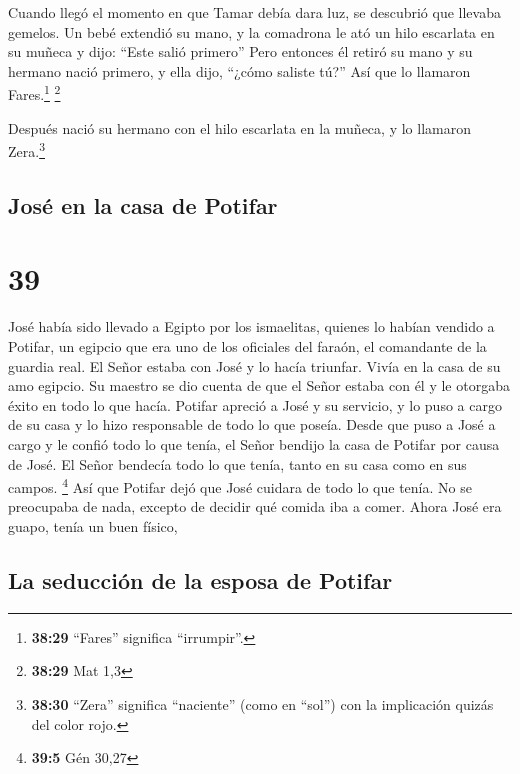  Cuando llegó el momento en que Tamar debía dara luz, se
descubrió que llevaba gemelos.  Un bebé extendió su mano,
y la comadrona le ató un hilo escarlata en su muñeca y dijo: ``Este
salió primero''  Pero entonces él retiró su mano y su
hermano nació primero, y ella dijo, ``¿cómo saliste tú?'' Así que lo
llamaron Fares.\footnote{\textbf{38:29} ``Fares'' significa
  ``irrumpir''.} \footnote{\textbf{38:29} Mat 1,3}

 Después nació su hermano con el hilo escarlata en la
muñeca, y lo llamaron Zera.\footnote{\textbf{38:30} ``Zera'' significa
  ``naciente'' (como en ``sol'') con la implicación quizás del color
  rojo.}

\hypertarget{josuxe9-en-la-casa-de-potifar}{%
\subsection{José en la casa de
Potifar}\label{josuxe9-en-la-casa-de-potifar}}

\hypertarget{section-38}{%
\section{39}\label{section-38}}

 José había sido llevado a Egipto por los ismaelitas,
quienes lo habían vendido a Potifar, un egipcio que era uno de los
oficiales del faraón, el comandante de la guardia real. 
El Señor estaba con José y lo hacía triunfar. Vivía en la casa de su amo
egipcio.  Su maestro se dio cuenta de que el Señor estaba
con él y le otorgaba éxito en todo lo que hacía.  Potifar
apreció a José y su servicio, y lo puso a cargo de su casa y lo hizo
responsable de todo lo que poseía.  Desde que puso a José
a cargo y le confió todo lo que tenía, el Señor bendijo la casa de
Potifar por causa de José. El Señor bendecía todo lo que tenía, tanto en
su casa como en sus campos. \footnote{\textbf{39:5} Gén 30,27}
 Así que Potifar dejó que José cuidara de todo lo que
tenía. No se preocupaba de nada, excepto de decidir qué comida iba a
comer. Ahora José era guapo, tenía un buen físico,

\hypertarget{la-seducciuxf3n-de-la-esposa-de-potifar}{%
\subsection{La seducción de la esposa de
Potifar}\label{la-seducciuxf3n-de-la-esposa-de-potifar}}

